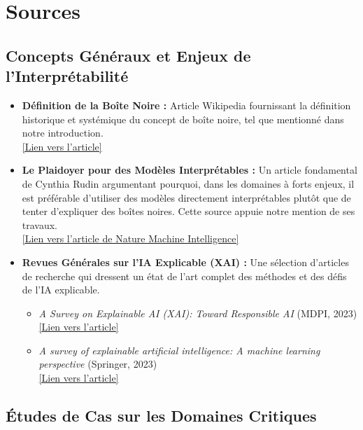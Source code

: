 \documentclass{article}
\begin{document}
\clearpage

\section{Sources}

\subsection*{Concepts Généraux et Enjeux de l'Interprétabilité}

\begin{itemize}
    \item \textbf{Définition de la Boîte Noire :} Article Wikipedia fournissant la définition historique et systémique du concept de boîte noire, tel que mentionné dans notre introduction. \\
    \href{https://en.wikipedia.org/wiki/Black_box}{[Lien vers l'article]}

    \item \textbf{Le Plaidoyer pour des Modèles Interprétables :} Un article fondamental de Cynthia Rudin argumentant pourquoi, dans les domaines à forts enjeux, il est préférable d'utiliser des modèles directement interprétables plutôt que de tenter d'expliquer des boîtes noires. Cette source appuie notre mention de ses travaux. \\
    \href{https://www.nature.com/articles/s42256-019-0141-1}{[Lien vers l'article de Nature Machine Intelligence]}

    \item \textbf{Revues Générales sur l'IA Explicable (XAI) :} Une sélection d'articles de recherche qui dressent un état de l'art complet des méthodes et des défis de l'IA explicable.
    \begin{itemize}
        \item \textit{A Survey on Explainable AI (XAI): Toward Responsible AI} (MDPI, 2023) \\
        \href{https://www.mdpi.com/2078-2489/14/8/426}{[Lien vers l'article]}
        \item \textit{A survey of explainable artificial intelligence: A machine learning perspective} (Springer, 2023) \\
        \href{https://link.springer.com/article/10.1007/s12559-023-10179-8}{[Lien vers l'article]}
    \end{itemize}
\end{itemize}

\subsection*{Études de Cas sur les Domaines Critiques}
\end{document}
